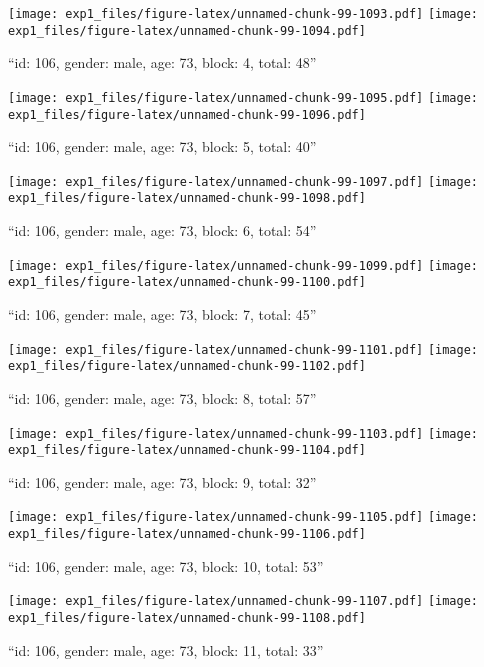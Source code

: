 \documentclass[,]{article}
\begin{document}
\texttt{[image: exp1\_files/figure-latex/unnamed-chunk-99-1093.pdf]}
\texttt{[image: exp1\_files/figure-latex/unnamed-chunk-99-1094.pdf]}

\newpage
[1] 

``id: 106, gender: male, age: 73, block: 4, total: 48''

\texttt{[image: exp1\_files/figure-latex/unnamed-chunk-99-1095.pdf]}
\texttt{[image: exp1\_files/figure-latex/unnamed-chunk-99-1096.pdf]}

\newpage
[1] 

``id: 106, gender: male, age: 73, block: 5, total: 40''

\texttt{[image: exp1\_files/figure-latex/unnamed-chunk-99-1097.pdf]}
\texttt{[image: exp1\_files/figure-latex/unnamed-chunk-99-1098.pdf]}

\newpage
[1] 

``id: 106, gender: male, age: 73, block: 6, total: 54''

\texttt{[image: exp1\_files/figure-latex/unnamed-chunk-99-1099.pdf]}
\texttt{[image: exp1\_files/figure-latex/unnamed-chunk-99-1100.pdf]}

\newpage
[1] 

``id: 106, gender: male, age: 73, block: 7, total: 45''

\texttt{[image: exp1\_files/figure-latex/unnamed-chunk-99-1101.pdf]}
\texttt{[image: exp1\_files/figure-latex/unnamed-chunk-99-1102.pdf]}

\newpage
[1] 

``id: 106, gender: male, age: 73, block: 8, total: 57''

\texttt{[image: exp1\_files/figure-latex/unnamed-chunk-99-1103.pdf]}
\texttt{[image: exp1\_files/figure-latex/unnamed-chunk-99-1104.pdf]}

\newpage
[1] 

``id: 106, gender: male, age: 73, block: 9, total: 32''

\texttt{[image: exp1\_files/figure-latex/unnamed-chunk-99-1105.pdf]}
\texttt{[image: exp1\_files/figure-latex/unnamed-chunk-99-1106.pdf]}

\newpage
[1] 

``id: 106, gender: male, age: 73, block: 10, total: 53''

\texttt{[image: exp1\_files/figure-latex/unnamed-chunk-99-1107.pdf]}
\texttt{[image: exp1\_files/figure-latex/unnamed-chunk-99-1108.pdf]}

\newpage
[1] 

``id: 106, gender: male, age: 73, block: 11, total: 33''
\end{document}
